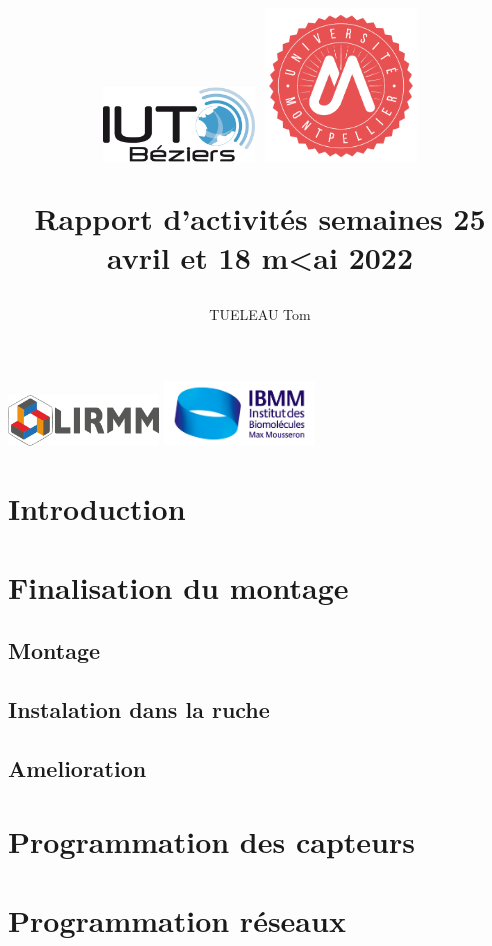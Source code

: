 \documentclass[11pt,french,a4paper]{article}
\title{
 \centering
         \includegraphics[width=4cm]{../../../logo/IUTlogo.png}  \hspace{7cm}
         \includegraphics[width=4cm]{../../../logo/UMlogo.png}  \hspace{7cm}
    
	\LARGE{Rapport d'activités semaines 25 avril et 18 m<ai 2022 }
	\author{TUELEAU Tom}
}
\author{
	\date{}
}
\begin{document}
\maketitle
	 \includegraphics[width=4cm]{../../../logo/LIRMMlogo.png}  \hspace{7cm}
         \includegraphics[width=4cm]{../../../logo/IBMMlogo.jpg}  \hspace{7cm}
\newpage
\tableofcontents
\newpage
\section{Introduction}
\section{Finalisation du montage}
\subsection{Montage}
\subsection{Instalation dans la ruche}
\subsection{Amelioration}
\section{Programmation des capteurs}
\section{Programmation réseaux}

\newpage
\listoffigures
\end{document}
